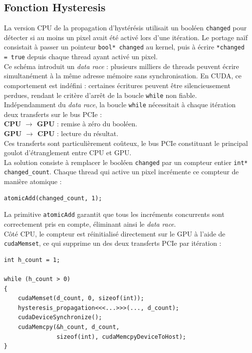 \documentclass[12pt]{article}
\begin{document}
    \subsection{Fonction Hysteresis}
    La version CPU de la propagation d'hystérésis utilisait un booléen \verb|changed| pour détecter si au moins un pixel avait été activé lors d'une itération. Le portage naïf consistait à passer un pointeur \verb|bool* changed| au kernel, puis à écrire \verb|*changed = true| depuis chaque thread ayant activé un pixel.
    \\
    Ce schéma introduit un \textit{data race} : plusieurs milliers de threads peuvent écrire simultanément à la même adresse mémoire sans synchronisation. En CUDA, ce comportement est indéfini : certaines écritures peuvent être silencieusement perdues, rendant le critère d'arrêt de la boucle \verb|while| non fiable.
    \\
    Indépendamment du \textit{data race}, la boucle \verb|while| nécessitait à chaque itération deux transferts sur le bus PCIe :
    \\
    \textbf{CPU $\rightarrow$ GPU} : remise à zéro du booléen. \\
    \textbf{GPU $\rightarrow$ CPU} : lecture du résultat.
    \\
    Ces transferts sont particulièrement coûteux, le bus PCIe constituant le principal goulot d'étranglement entre CPU et GPU.
    \\
    La solution consiste à remplacer le booléen \verb|changed| par un compteur entier \verb|int* changed_count|. Chaque thread qui active un pixel incrémente ce compteur de manière atomique :

    \begin{verbatim}
atomicAdd(changed_count, 1);
    \end{verbatim}

    La primitive \verb|atomicAdd| garantit que tous les incréments concurrents sont correctement pris en compte, éliminant ainsi le \textit{data race}.
    \\
    Côté CPU, le compteur est réinitialisé directement sur le GPU à l'aide de \verb|cudaMemset|, ce qui supprime un des deux transferts PCIe par itération :

    \begin{verbatim}
int h_count = 1;

while (h_count > 0)
{
    cudaMemset(d_count, 0, sizeof(int));
    hysteresis_propagation<<<...>>>(..., d_count);
    cudaDeviceSynchronize();
    cudaMemcpy(&h_count, d_count,
               sizeof(int), cudaMemcpyDeviceToHost);
}
    \end{verbatim}
\end{document}
